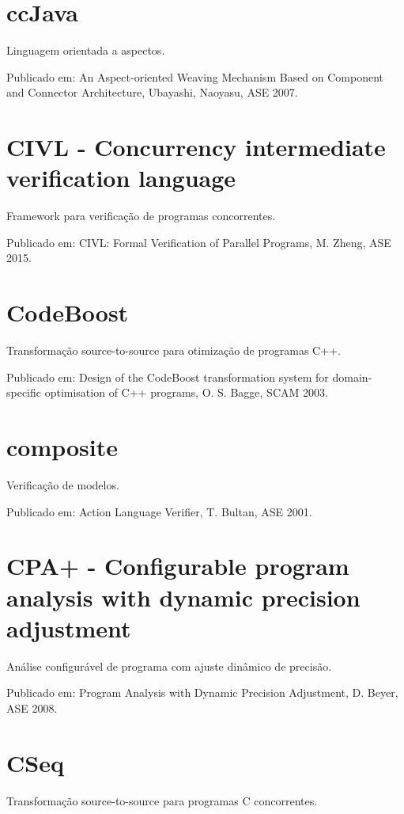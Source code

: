 \section{ccJava}

Linguagem orientada a aspectos.

Publicado em: An Aspect-oriented Weaving Mechanism Based on Component and Connector Architecture,
Ubayashi, Naoyasu,
ASE
2007.

\section{CIVL - Concurrency intermediate verification language}

Framework para verificação de programas concorrentes.

Publicado em: CIVL: Formal Verification of Parallel Programs,
M. Zheng,
ASE
2015.

\section{CodeBoost}

Transformação source-to-source para otimização de programas C++.

Publicado em: Design of the CodeBoost transformation system for domain-specific optimisation of C++ programs,
O. S. Bagge,
SCAM
2003.

\section{composite}

Verificação de modelos.

Publicado em: Action Language Verifier,
T. Bultan,
ASE
2001.

\section{CPA+ - Configurable program analysis with dynamic precision adjustment}

Análise configurável de programa com ajuste dinâmico de precisão.

Publicado em: Program Analysis with Dynamic Precision Adjustment,
D. Beyer,
ASE
2008.

\section{CSeq}

Transformação source-to-source para programas C concorrentes.

